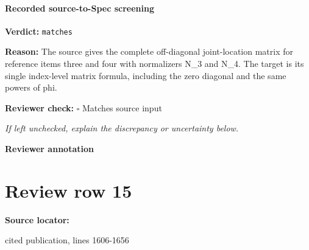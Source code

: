 \documentclass[10pt]{article}
\newcommand{\reviewerbox}{%
  \par\noindent\fbox{\parbox{0.96\linewidth}{\rule{0pt}{0.38in}}}\par
}
\newcommand{\reviewmatch}[1]{%
  \par\noindent\textbf{Reviewer check:} $\square$\; #1\par
  \noindent\emph{If left unchecked, explain the discrepancy or uncertainty below.}\par
}
\begin{document}
\paragraph{Recorded source-to-Spec screening}
\textbf{Verdict:} \texttt{matches}
\\
{\raggedright
\textbf{Reason:} The source gives the complete off-\allowbreak{}diagonal joint-\allowbreak{}location matrix for reference items three and four with normalizers N\_\allowbreak{}3 and N\_\allowbreak{}4.\allowbreak{} The target is its single index-\allowbreak{}level matrix formula, including the zero diagonal and the same powers of phi.\allowbreak{}
\par}
\reviewmatch{Matches source input}
\noindent\textbf{Reviewer annotation}\par
\reviewerbox
\clearpage
\hypertarget{source-claim-ddc5814263488e0b}{}
\section*{Review row 15}
\textbf{Source locator:} {\footnotesize\raggedright cited publication, lines 1606-\allowbreak{}1656\par}
\end{document}
